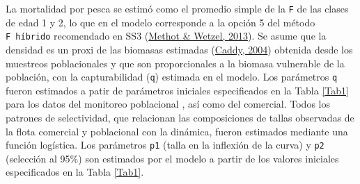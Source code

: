 \documentclass[
]{article}
\begin{document}
La mortalidad por pesca se estimó como el promedio simple de la \texttt{F} de las clases de edad 1 y 2, lo que en el modelo corresponde a la opción 5 del método \texttt{F\ híbrido} recomendado en SS3 (\protect\hyperlink{ref-Methot2013}{Methot \& Wetzel, 2013}). Se asume que la densidad es un proxi de las biomasas estimadas (\protect\hyperlink{ref-Caddy2004}{Caddy, 2004}) obtenida desde los muestreos poblacionales y que son proporcionales a la biomasa vulnerable de la población, con la capturabilidad (\texttt{q}) estimada en el modelo. Los parámetros \texttt{q} fueron estimados a patir de parámetros iniciales especificados en la Tabla \ref{Tab1} para los datos del monitoreo poblacional , así como del comercial. Todos los patrones de selectividad, que relacionan las composiciones de tallas observadas de la flota comercial y poblacional con la dinámica, fueron estimados mediante una función logística. Los parámetros \texttt{p1} (talla en la inflexión de la curva) y \texttt{p2} (selección al 95\%) son estimados por el modelo a partir de los valores iniciales especificados en la Tabla \ref{Tab1}.
\end{document}
